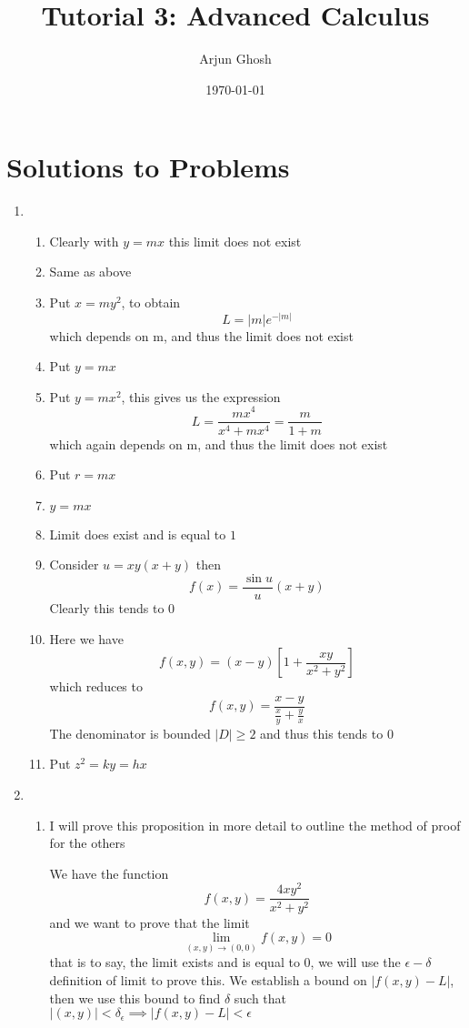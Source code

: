 \documentclass[12pt]{article}
\title{Tutorial 3: Advanced Calculus}
\author{Arjun Ghosh}
\date{\today}
\begin{document}
\maketitle

\section*{Solutions to Problems}

\begin{enumerate}
	\item
	
		\begin{enumerate}
			\item 
				Clearly with $y=mx$ this limit does not exist
			\item
				Same as above
			\item
				Put $x = my^{2}$, to obtain
				$$
				L = |m|e^{ -|m| }
				$$
				which depends on m, and thus the limit does not exist
			\item
				Put $y=mx$
			\item
				Put $y=mx^{2}$, this gives us the expression
				$$
				L = \frac{mx^{4}}{x^{4 }+mx^{4}} = \frac{m}{1+m}
				$$
				which again depends on m, and thus the limit does not exist
			\item
				Put $r = mx$
			\item
				$y=mx$
			\item
				Limit does exist and is equal to $1$
			\item
				Consider $u = xy(x+y)$
				then
				$$
				f(x) = \frac{\sin u}{u} (x+y)
				$$
				Clearly this tends to $0$
			\item
				Here we have
				$$
				f(x,y) = (x-y)\left[ 1 + \frac{xy}{x^{2} + y^{2}} \right]
				$$
				which reduces to
				$$
				f(x,y) = \frac{x-y}{ \frac{x}{y} + \frac{y}{x} }
				$$
				The denominator is bounded $|D| \geq 2$ and thus this tends to $0$
			\item
				Put $z^{2} = ky = hx$
		\end{enumerate}

	\item
		\begin{enumerate}
			\item
				I will prove this proposition in more detail to outline the method of proof for the others

				We have the function
				$$
				f(x,y) = \frac{4xy^{2}}{x^{2} + y^{2}}
				$$
				and we want to prove that the limit 
				$$
				\lim_{ (x,y) \to (0,0) } f(x,y) = 0
				$$
				that is to say, the limit exists and is equal to $0$, we will use the $\epsilon-\delta$ definition of limit to prove this.
				We establish a bound on $|f(x,y)-L|$, then we use this bound to find $\delta$ such that
				$|(x,y)|<\delta_{\epsilon} \implies |f(x,y)-L| < \epsilon$


\end{enumerate}
\end{enumerate}
\end{document}
